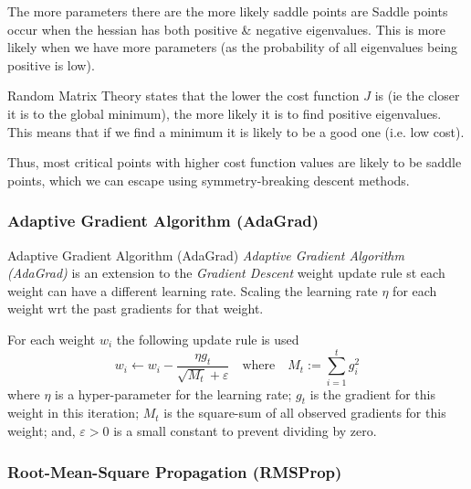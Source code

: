 \documentclass[11pt,a4paper]{article}
\begin{document}
  \begin{remark}{The more parameters there are the more likely saddle points are}
    Saddle points occur when the hessian has both positive \& negative eigenvalues. This is more likely when we have more parameters (as the probability of all eigenvalues being positive is low).
    \par Random Matrix Theory states that the lower the cost function $J$ is (ie the closer it is to the global minimum), the more likely it is to find positive eigenvalues. This means that if we find a minimum it is likely to be a good one (i.e. low cost).
    \par Thus, most critical points with higher cost function values are likely to be saddle points, which we can escape using symmetry-breaking descent methods.
  \end{remark}

\subsubsection{Adaptive Gradient Algorithm (AdaGrad)}

  \begin{definition}{Adaptive Gradient Algorithm (AdaGrad)}
    \textit{Adaptive Gradient Algorithm (AdaGrad)} is an extension to the \textit{Gradient Descent} weight update rule st each weight can have a different learning rate. Scaling the learning rate $\eta$ for each weight wrt the past gradients for that weight.
    \par For each weight $w_i$ the following update rule is used
    \[
      w_i\leftarrow w_i-\frac{\eta g_t}{\sqrt{M_t}+\varepsilon}\quad\text{where}\quad M_t:=\sum_{i=1}^t g_i^2
    \]
    where $\eta$ is a hyper-parameter for the learning rate; $g_t$ is the gradient for this weight in this iteration; $M_t$ is the square-sum of all observed gradients for this weight; and, $\varepsilon>0$ is a small constant to prevent dividing by zero.
  \end{definition}

\subsubsection{Root-Mean-Square Propagation (RMSProp)}
\end{document}
